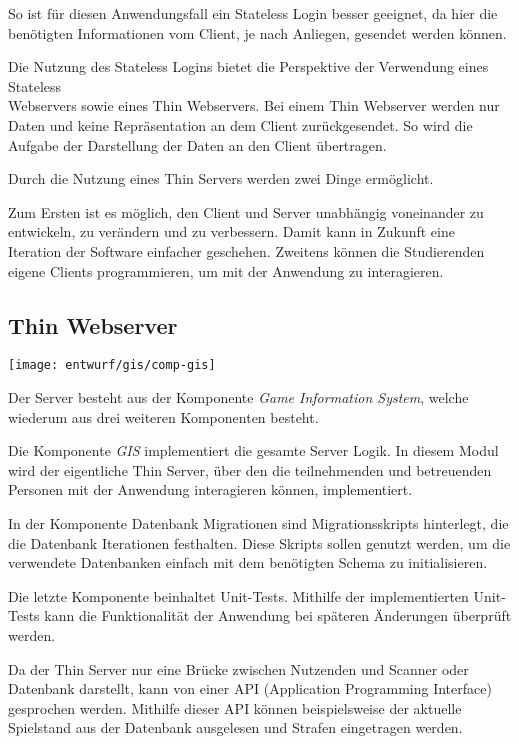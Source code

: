 So ist für diesen Anwendungsfall ein Stateless Login besser geeignet, da hier die benötigten Informationen vom Client, je nach Anliegen, gesendet werden können. 

Die Nutzung des Stateless Logins bietet die Perspektive der Verwendung eines Stateless \\ Webservers sowie eines Thin Webservers. Bei einem Thin Webserver werden nur Daten und keine Repräsentation an dem Client zurückgesendet. So wird die Aufgabe der Darstellung der Daten an den Client übertragen.

Durch die Nutzung eines Thin Servers werden zwei Dinge ermöglicht. 

Zum Ersten ist es möglich, den Client und Server unabhängig voneinander zu entwickeln, zu verändern und zu verbessern. Damit kann in Zukunft eine Iteration der Software einfacher geschehen. Zweitens können die Studierenden eigene Clients programmieren, um mit der Anwendung zu interagieren.

\subsection{Thin Webserver}
\begin{center}
	\texttt{[image: entwurf/gis/comp-gis]}
\end{center}

Der Server besteht aus der Komponente \textit{Game Information System}, welche wiederum aus drei weiteren Komponenten besteht. 

Die Komponente \textit{GIS} implementiert die gesamte Server Logik. In diesem Modul wird der eigentliche Thin Server, über den die teilnehmenden und betreuenden Personen mit der Anwendung interagieren können, implementiert.

In der Komponente Datenbank Migrationen sind Migrationsskripts hinterlegt, die die Datenbank Iterationen festhalten. Diese Skripts sollen genutzt werden, um die verwendete Datenbanken einfach mit dem benötigten Schema zu initialisieren. 

Die letzte Komponente beinhaltet Unit-Tests. Mithilfe der implementierten Unit-Tests kann die Funktionalität der Anwendung bei späteren Änderungen überprüft werden.

Da der Thin Server nur eine Brücke zwischen Nutzenden und Scanner oder Datenbank darstellt, kann von einer API (Application Programming Interface) gesprochen werden. Mithilfe dieser API können beispielsweise der aktuelle Spielstand aus der Datenbank ausgelesen und Strafen eingetragen werden.

